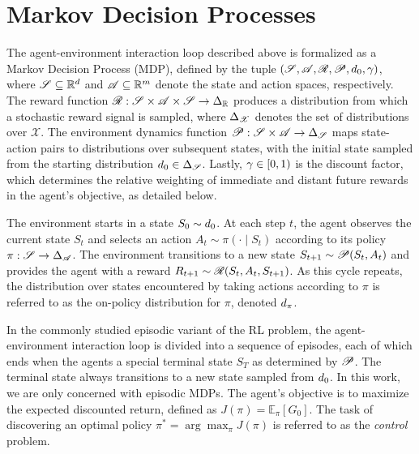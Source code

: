\section{Markov Decision Processes}
The agent-environment interaction loop described above is formalized as a Markov Decision Process (MDP), defined by the tuple $(\mathscr{S}, \mathscr{A}, \mathscr{R}, \mathscr{P}, d_{0}, \gamma)$, where $\mathscr{S} \subseteq \mathbb{R}^d$ and $\mathscr{A} \subseteq \mathbb{R}^m$ denote the state and action spaces, respectively. The reward function
$\mathscr{R}: \mathscr{S} \times \mathscr{A} \times \mathscr{S} \to \Delta_{\mathbb{R}}$ produces a distribution from which a stochastic reward signal is sampled, where $\Delta_{\mathscr{X}}$ denotes
the set of distributions over $\mathscr{X}$. The environment dynamics function $\mathscr{P}: \mathscr{S} \times \mathscr{A} \to \Delta_{\mathscr{S}}$
maps state-action pairs to distributions over subsequent states, with the initial state sampled from the starting distribution
$d_{0} \in \Delta_{\mathscr{S}}$. Lastly, $\gamma \in [0, 1)$ is the discount factor, which determines the relative weighting of immediate and distant future rewards in the agent's objective, as detailed below. 

The environment starts in a state $S_0 \sim d_{0}$. At each step $t$, the agent observes
the current state $S_t$ and selects an action $A_t \sim \pi(\cdot \mid S_t)$ according to its policy $\pi:
\mathscr{S} \to \Delta_{\mathscr{A}}$. The environment transitions to a new state $S_{t + 1} \sim
\mathscr{P}(S_t, A_t)$ and provides the agent with a reward $R_{t+1} \sim \mathscr{R}(S_t, A_t, S_{t + 1})$. As this cycle repeats, the distribution over states encountered by taking actions according to $\pi$ is referred to as the on-policy distribution for $\pi$, denoted $d_{\pi}$. 

In the commonly studied episodic variant of the RL problem, the agent-environment interaction loop is divided into a sequence of episodes, each of which ends when the agents a special terminal state $S_T$ as determined by $\mathscr{P}$. The terminal state always transitions to a new state sampled from $d_{0}$. In this work, we are only concerned with episodic MDPs.
The agent's objective is to maximize the expected discounted return, defined as $J(\pi) = \mathbb{E}_\pi \left[ G_0 \right]$. The task of discovering an optimal policy $\pi^* = \arg\max_\pi J(\pi)$ is referred to as the \textit{control} problem.

